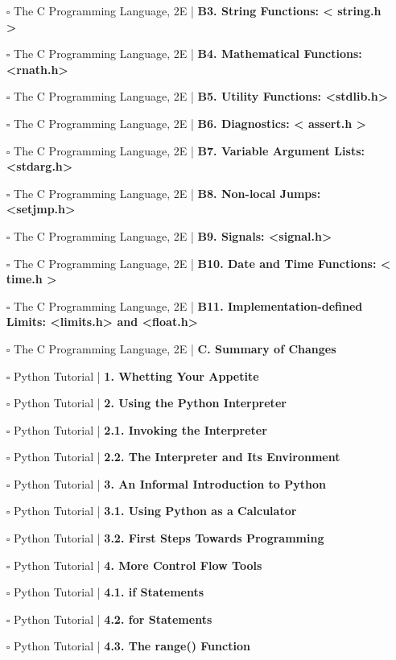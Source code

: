 \documentclass[a4, landscape, 12pt]{article}
\newcommand{\checkbox}{$\square$}%
\begin{document}
\begin{itemize}
{}
\item [\checkbox]  The C Programming Language, 2E | \textbf{ B3. String Functions: < string.h >
}
\item [\checkbox]  The C Programming Language, 2E | \textbf{ B4. Mathematical Functions: <rnath.h>
}
\item [\checkbox]  The C Programming Language, 2E | \textbf{ B5. Utility Functions: <stdlib.h>
}
\item [\checkbox]  The C Programming Language, 2E | \textbf{ B6. Diagnostics: < assert.h >
}
\item [\checkbox]  The C Programming Language, 2E | \textbf{ B7. Variable Argument Lists: <stdarg.h>
}
\item [\checkbox]  The C Programming Language, 2E | \textbf{ B8. Non-local Jumps: <setjmp.h>
}
\item [\checkbox]  The C Programming Language, 2E | \textbf{ B9. Signals: <signal.h>
}
\item [\checkbox]  The C Programming Language, 2E | \textbf{ B10. Date and Time Functions: < time.h >
}
\item [\checkbox]  The C Programming Language, 2E | \textbf{ B11. Implementation-defined Limits: <limits.h> and <float.h>
}
\item [\checkbox]  The C Programming Language, 2E | \textbf{ C. Summary of Changes
}
\item [\checkbox]  Python Tutorial | \textbf{ 1. Whetting Your Appetite
}
\item [\checkbox]  Python Tutorial | \textbf{ 2. Using the Python Interpreter
}
\item [\checkbox]  Python Tutorial | \textbf{ 2.1. Invoking the Interpreter
}
\item [\checkbox]  Python Tutorial | \textbf{ 2.2. The Interpreter and Its Environment
}
\item [\checkbox]  Python Tutorial | \textbf{ 3. An Informal Introduction to Python
}
\item [\checkbox]  Python Tutorial | \textbf{ 3.1. Using Python as a Calculator
}
\item [\checkbox]  Python Tutorial | \textbf{ 3.2. First Steps Towards Programming
}
\item [\checkbox]  Python Tutorial | \textbf{ 4. More Control Flow Tools
}
\item [\checkbox]  Python Tutorial | \textbf{ 4.1. if Statements
}
\item [\checkbox]  Python Tutorial | \textbf{ 4.2. for Statements
}
\item [\checkbox]  Python Tutorial | \textbf{ 4.3. The range() Function
}
\end{itemize}
\end{document}
